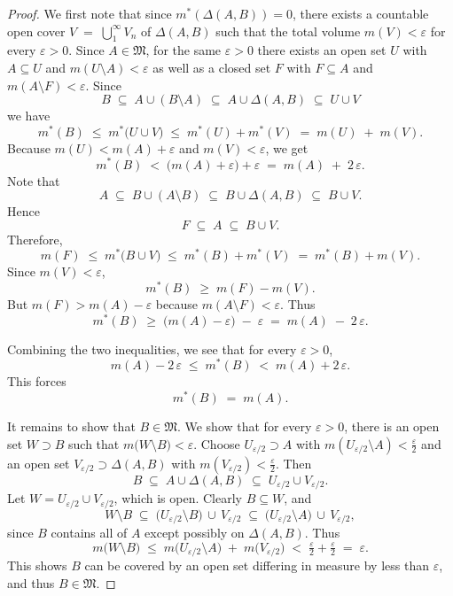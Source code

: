 \documentclass[11pt]{article}
\let\eps\varepsilon
\begin{document}
\begin{exercise}{3}
    \begin{proof}
We first note that since $m^*(\Delta(A,B)) = 0$, there exists a countable open cover 
\(
V \;=\; \bigcup_1^\infty V_n
\)
of $\Delta(A,B)$ such that the total volume $m(V) < \varepsilon$ for every $\varepsilon > 0$. 
Since $A \in \mathfrak{M}$, for the same $\varepsilon > 0$ there exists an open set $U$ with $A \subseteq U$ and $m(U \setminus A) < \eps$ as well as a closed set $F$ with $F \subseteq A$ and $m(A \setminus F) < \eps$. Since 
\[
B \;\subseteq\; A \cup (B \setminus A) \;\subseteq\; A \cup \Delta(A,B) \;\subseteq\; U \cup V
\]
we have
\[
m^*(B) 
\;\le\; 
m^*\bigl(U \cup V\bigr) 
\;\le\; 
m^*(U) + m^*(V) 
\;=\; 
m(U) \;+\; m(V).
\]
Because $m(U) < m(A) + \varepsilon$ and $m(V) < \varepsilon$, we get
\[
m^*(B) 
\;<\; 
\bigl(m(A) + \varepsilon \bigr) + \varepsilon 
\;=\; 
m(A) \;+\; 2\,\varepsilon.
\]
Note that
\[
A 
\;\subseteq\; 
B \cup (A \setminus B) 
\;\subseteq\; 
B \cup \Delta(A,B)
\;\subseteq\;
B \cup V.
\]
Hence 
\[
F 
\;\subseteq\; 
A
\;\subseteq\; 
B \cup V.
\]
Therefore,
\[
m(F)
\;\le\; 
m^*\bigl(B \cup V\bigr)
\;\le\; 
m^*(B) + m^*(V)
\;=\; 
m^*(B) + m(V).
\]
Since $m(V)<\varepsilon$, 
\[
m^*(B) 
\;\ge\; 
m(F) - m(V).
\]
But $m(F) > m(A) - \varepsilon$ because $m(A \setminus F) < \varepsilon$. Thus
\[
m^*(B) 
\;\ge\; 
\bigl(m(A) - \varepsilon\bigr) \;-\; \varepsilon
\;=\;
m(A) \;-\; 2\,\varepsilon.
\]

Combining the two inequalities, we see that for every $\varepsilon>0$,
\[
m(A) - 2\,\varepsilon 
\;\le\; 
m^*(B) 
\;<\; 
m(A) + 2\,\varepsilon.
\] This forces
\[
m^*(B) 
\;=\; 
m(A).
\]

It remains to show that $B \in \mathfrak{M}$. We show that for every $\varepsilon>0$, there is an open set $W \supset B$ 
such that $m\bigl(W \setminus B\bigr) < \varepsilon$.  
Choose $U_{\varepsilon/2} \supset A$ with $m(U_{\varepsilon/2} \setminus A) < \tfrac{\varepsilon}{2}$ 
and an open set $V_{\varepsilon/2} \supset \Delta(A,B)$ with $m(V_{\varepsilon/2}) < \tfrac{\varepsilon}{2}$.  
Then
\[
B 
\;\subseteq\; 
A \cup \Delta(A,B)
\;\subseteq\; 
U_{\varepsilon/2} \cup V_{\varepsilon/2}.
\]
Let $W = U_{\varepsilon/2} \cup V_{\varepsilon/2}$, which is open.  Clearly $B \subseteq W$, and
\[
W \setminus B 
\;\subseteq\; 
\bigl(U_{\varepsilon/2} \setminus B \bigr)\,\cup\, V_{\varepsilon/2}
\;\subseteq\; 
\bigl(U_{\varepsilon/2} \setminus A\bigr)\,\cup\, V_{\varepsilon/2},
\]
since $B$ contains all of $A$ except possibly on $\Delta(A,B)$. Thus
\[
m\bigl(W \setminus B\bigr)
\;\le\;
m\bigl(U_{\varepsilon/2} \setminus A\bigr)
\;+\;
m\bigl(V_{\varepsilon/2}\bigr)
\;<\;
\tfrac{\varepsilon}{2} + \tfrac{\varepsilon}{2}
\;=\;
\varepsilon.
\]
This shows $B$ can be covered by an open set differing in measure by less than $\varepsilon$, and thus $B \in \mathfrak{M}$.
\end{proof}
\end{exercise}
\end{document}
